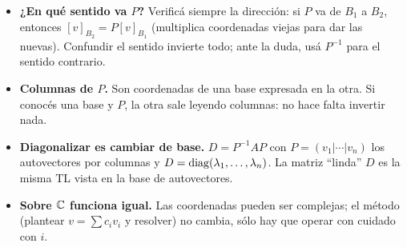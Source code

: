 \begin{truco}
\begin{itemize}
\item \textbf{¿En qué sentido va $P$?} Verificá siempre la dirección: si $P$ va de $B_1$ a $B_2$, entonces $[v]_{B_2}=P[v]_{B_1}$ (multiplica coordenadas viejas para dar las nuevas). Confundir el sentido invierte todo; ante la duda, usá $P^{-1}$ para el sentido contrario.
\item \textbf{Columnas de $P$.} Son coordenadas de una base expresada en la otra. Si conocés una base y $P$, la otra sale leyendo columnas: no hace falta invertir nada.
\item \textbf{Diagonalizar es cambiar de base.} $D=P^{-1}AP$ con $P=(v_1|\cdots|v_n)$ los autovectores por columnas y $D=\operatorname{diag}(\lambda_1,\dots,\lambda_n)$. La matriz ``linda'' $D$ es la misma TL vista en la base de autovectores.
\item \textbf{Sobre $\mathbb{C}$ funciona igual.} Las coordenadas pueden ser complejas; el método (plantear $v=\sum c_i v_i$ y resolver) no cambia, sólo hay que operar con cuidado con $i$.
\end{itemize}
\end{truco}

